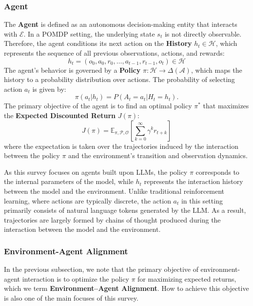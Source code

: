 \documentclass{llmxive}
\begin{document}
\subsubsection{Agent}

The \textbf{Agent} is defined as an autonomous decision-making entity that interacts with $\mathcal{E}$. In a POMDP setting, the underlying state $s_t$ is not directly observable. Therefore, the agent conditions its next action on the \textbf{History} $h_t \in \mathcal{H}$, which represents the sequence of all previous observations, actions, and rewards:
\begin{equation}
    h_t = (o_0, a_0, r_0, \dots, a_{t-1}, r_{t-1}, o_t) \in \mathcal{H}
\end{equation}
The agent's behavior is governed by a \textbf{Policy} $\pi: \mathcal{H} \rightarrow \Delta(\mathcal{A})$, which maps the history to a probability distribution over actions. The probability of selecting action $a_t$ is given by:
\begin{equation}
    \pi(a_t | h_t) = P(A_t = a_t | H_t = h_t).
\end{equation}
The primary objective of the agent is to find an optimal policy $\pi^*$ that maximizes the \textbf{Expected Discounted Return} $J(\pi)$:
\begin{equation}
    J(\pi) = \mathbb{E}_{\pi, \mathcal{P}, \mathcal{O}} \left[ \sum_{k=0}^{\infty} \gamma^k r_{t+k} \right]
\end{equation}
where the expectation is taken over the trajectories induced by the interaction between the policy $\pi$ and the environment's transition and observation dynamics.

As this survey focuses on agents built upon LLMs, the policy $\pi$ corresponds to the internal parameters of the model, while $h_t$ represents the interaction history between the model and the environment. Unlike traditional reinforcement learning, where actions are typically discrete, the action $a_t$ in this setting primarily consists of natural language tokens generated by the LLM. As a result, trajectories are largely formed by chains of thought produced during the interaction between the model and the environment.

\subsubsection{Environment-Agent Alignment}
In the previous subsection, we note that the primary objective of environment-agent interaction is to optimize the policy $\pi$ for maximizing expected returns, which we term \textbf{Environment–Agent Alignment}. How to achieve this objective is also one of the main focuses of this survey.
\end{document}
